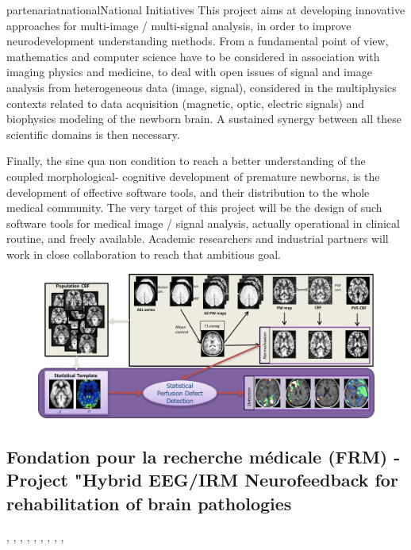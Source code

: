\documentclass{ra2018}
\begin{document}
\begin{module}{partenariat}{national}{National Initiatives}
        This project aims at developing innovative approaches for multi-image /
        multi-signal analysis, in order to improve neurodevelopment understanding
        methods. From a fundamental point of view, mathematics and computer science
        have to be considered in association with imaging physics and medicine, to deal
        with open issues of signal and image analysis from heterogeneous data (image,
        signal), considered in the multiphysics contexts related to data acquisition
        (magnetic, optic, electric signals) and biophysics modeling of the newborn
        brain. A sustained synergy between all these scientific domains is then
        necessary.
        
        Finally, the sine qua non condition to reach a better understanding of the
        coupled morphological- cognitive development of premature newborns, is the
        development of effective software tools, and their distribution to the whole
        medical community. The very target of this project will be the design of such
        software tools for medical image / signal analysis, actually operational in
        clinical routine, and freely available. Academic researchers and industrial
        partners will work in close collaboration to reach that ambitious goal.


        \begin{figure}[htbp]
          \centerline{
            \includegraphics[width=\textwidth]{IMG/ASL_quantification}
          }
        \end{figure}
        
         \subsection{Fondation pour la recherche médicale (FRM) - Project "Hybrid EEG/IRM Neurofeedback for  rehabilitation of brain pathologies}
        \begin{participants}
        	, 
        	,
        	, 
        	,
        	, 
        	, 
        	, 
        	,
        	, 
        \end{participants}	
        

\end{module}
\end{document}
